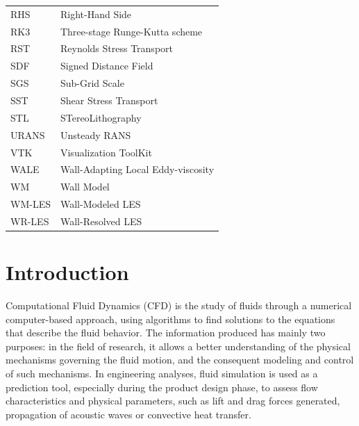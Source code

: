 \documentclass[12pt, a4paper, twoside, openright]{book}
\begin{document}
\begin{longtable}{p{} p{}}
    RHS                                          & Right-Hand Side\\
    RK3                                          & Three-stage Runge-Kutta scheme \\
	RST											 & Reynolds Stress Transport\\
    SDF                                          & Signed Distance Field\\
    SGS                                          & Sub-Grid Scale                                                        \\
    SST                                          & Shear Stress Transport                                                \\
    STL                                          & STereoLithography\\
    URANS                                        & Unsteady RANS                                                         \\
    VTK                                          & Visualization ToolKit\\
    WALE                                         & Wall-Adapting Local Eddy-viscosity \\
    WM                                           & Wall Model \\
    WM-LES                                       & Wall-Modeled LES                                                      \\
    WR-LES                                       & Wall-Resolved LES                                                     \\


\end{longtable}

\mainmatter

\chapter{Introduction}

Computational Fluid Dynamics (CFD) is the study of fluids through a numerical computer-based approach, using algorithms to find solutions to the equations that describe the fluid behavior. The information produced has mainly two purposes: in the field of research, it allows a better understanding of the physical mechanisms governing the fluid motion, and the consequent modeling and control of such mechanisms. In engineering analyses, fluid simulation is used as a prediction tool, especially during the product design phase, to assess flow characteristics and physical parameters, such as lift and drag forces generated, propagation of acoustic waves or convective heat transfer.
\end{document}

